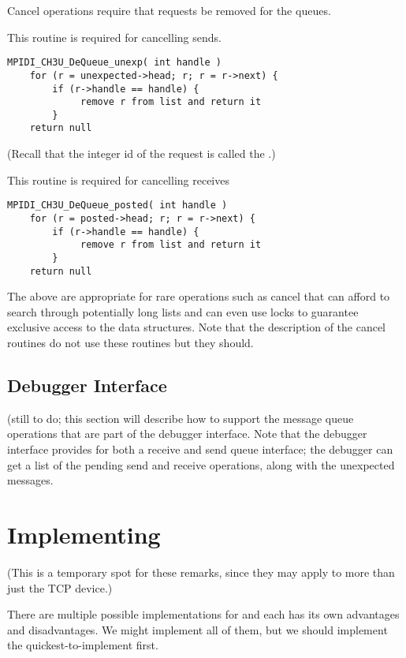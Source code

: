 \documentclass{article}
\begin{document}
Cancel operations require that requests be removed for the queues.

This routine is required for cancelling sends.
\begin{verbatim}
MPIDI_CH3U_DeQueue_unexp( int handle )
    for (r = unexpected->head; r; r = r->next) {
        if (r->handle == handle) {
             remove r from list and return it
        }
    return null
\end{verbatim}
(Recall that the integer id of the request is called the .)

This routine is required for cancelling receives
\begin{verbatim}
MPIDI_CH3U_DeQueue_posted( int handle )
    for (r = posted->head; r; r = r->next) {
        if (r->handle == handle) {
             remove r from list and return it
        }
    return null
\end{verbatim}
The above are appropriate for rare operations such as cancel that can 
afford to search through potentially long lists and can even use locks
to guarantee exclusive access to the data structures.  Note that the
description of the cancel routines do not use these routines but they should.

\subsection{Debugger Interface}
(still to do; this section will describe how to support the message
queue operations that are part of the debugger interface.  Note that
the debugger interface provides for both a receive and send queue
interface; the debugger can get a list of the pending send and receive
operations, along with the unexpected messages.

\section{Implementing \protect{}}
\label{sec:mpiexec}

(This is a temporary spot for these remarks, since they may apply to more than
just the TCP device.)

There are multiple possible implementations for  and each has
its own advantages and disadvantages.  We might implement all of them, but we
should implement the quickest-to-implement first.
\end{document}
